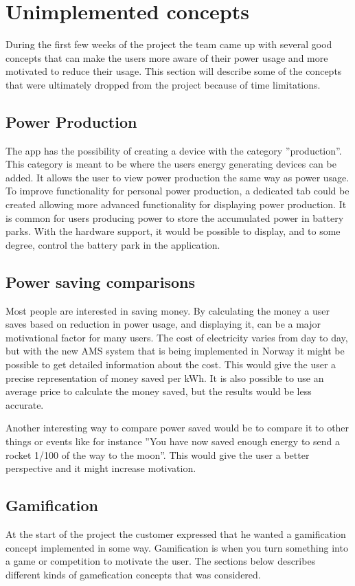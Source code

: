 \section{Unimplemented concepts}
During the first few weeks of the project the team came up with several good concepts that can make the users more aware of their power usage and more motivated to reduce their usage. This section will describe some of the concepts that were ultimately dropped from the project because of time limitations.

\subsection{Power Production}
The app has the possibility of creating a device with the category ''production''. This category is meant to be where the users energy generating devices can be added. It allows the user to view power production the same way as power usage. To improve functionality for personal power production, a dedicated tab could be created allowing more advanced functionality for displaying power production.
It is common for users producing power to store the accumulated power in battery parks. With the hardware support, it would be possible to display, and to some degree, control the battery park in the application.

\subsection{Power saving comparisons}
\label{sec:psc}
Most people are interested in saving money. By calculating the money a user saves based on reduction in power usage, and displaying it, can be a major motivational factor for many users. The cost of electricity varies from day to day, but with the new AMS\cite{ams} system that is being implemented in Norway it might be possible to get detailed information about the cost. This would give the user a precise representation of money saved per kWh. It is also possible to use an average price to calculate the money saved, but the results would be less accurate.

Another interesting way to compare power saved would be to compare it to other things or events like for instance ''You have now saved enough energy to send a rocket 1/100 of the way to the moon''. This would give the user a better perspective and it might increase motivation.

\subsection{Gamification}
At the start of the project the customer expressed that he wanted a gamification concept implemented in some way. Gamification is when you turn something into a game or competition to motivate the user. The sections below describes different kinds of gamefication concepts that was considered.

